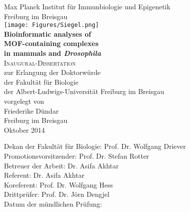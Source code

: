 \documentclass[11pt, a4paper, twoside]{MPIthesis} %
\begin{document}
\begin{titlepage}
\begin{center}

\large Max Planck Institut für Immunbiologie und Epigenetik\\Freiburg im Breisgau \\[1cm]

\texttt{[image: Figures/Siegel.png]}
\\[1.3cm]


{\huge \textbf{Bioinformatic analyses of\\MOF-containing complexes\\[9pt]in mammals and \textit{Drosophila}}}\\[1.5cm] %


\textsc{\LARGE Inaugural-Dissertation}\\[1cm] %
\large zur Erlangung der Doktorwürde\\der Fakultät für Biologie\\der Albert-Ludwigs-Universität Freiburg im Breisgau\\[1cm] %

\large vorgelegt von\\Friederike Dündar \\[1.5cm]

\large Freiburg im Breisgau \\ Oktober 2014 \\ %

\vfill
\end{center}

\end{titlepage}


\thispagestyle{empty}
\vspace*{\fill}
Dekan der Fakultät für Biologie: Prof. Dr. Wolfgang Driever \\
Promotionsvorsitzender: Prof. Dr. Stefan Rotter \\
Betreuer der Arbeit: Dr. Asifa Akhtar \\
Referent: Dr. Asifa Akhtar \\
Koreferent: Prof. Dr. Wolfgang Hess \\
Drittprüfer: Prof. Dr. Jörn Dengjel\\
Datum der mündlichen Prüfung:
\clearpage
\end{document}
